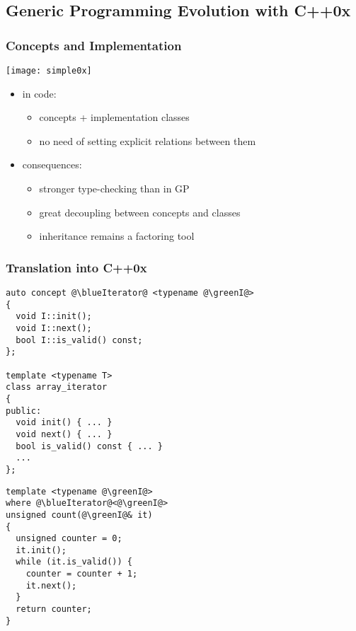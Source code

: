 \subsection{Generic Programming Evolution with C++0x}



\begin{frame}[fragile]
  \frametitle{Concepts and Implementation}

\begin{multicols}{2}
%
  \begin{center}
    \texttt{[image: simple0x]}
  \end{center}
%
\columnbreak
%
{\scriptsize
\begin{itemize}
\item in code:
  \begin{itemize}
  \item concepts + implementation classes
  \item no need of setting explicit relations between them
  \end{itemize}
  \smallskip
\item consequences:
  \begin{itemize}
  \item stronger type-checking than in GP
  \item great decoupling between concepts and classes
  \item inheritance remains a factoring tool
  \end{itemize}
\end{itemize}
}
%
\end{multicols}

\end{frame}



\begin{frame}[fragile]
  \frametitle{Translation into C++0x}

\begin{multicols}{2}
%
\begin{lstlisting}[escapechar=@]
auto concept @\blueIterator@ <typename @\greenI@>
{
  void I::init();
  void I::next();
  bool I::is_valid() const;
};

template <typename T>
class array_iterator
{
public:
  void init() { ... }
  void next() { ... }
  bool is_valid() const { ... }
  ...
};
\end{lstlisting}
%
\columnbreak
%
\begin{lstlisting}[escapechar=@]
template <typename @\greenI@>
where @\blueIterator@<@\greenI@>
unsigned count(@\greenI@& it)
{
  unsigned counter = 0;
  it.init();
  while (it.is_valid()) {
    counter = counter + 1;
    it.next();
  }
  return counter;
}
\end{lstlisting}
%
\end{multicols}

\end{frame}




